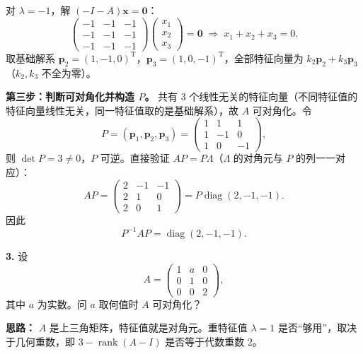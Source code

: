 对 \(\lambda=-1\)，解 \((-I-A)\mathbf{x}=\mathbf{0}\)：
\[
\begin{pmatrix}-1&-1&-1\\-1&-1&-1\\-1&-1&-1\end{pmatrix}
\begin{pmatrix}x_1\\x_2\\x_3\end{pmatrix}=\mathbf{0}
\;\Longrightarrow\;
x_1+x_2+x_3=0.
\]
取基础解系 \(\mathbf{p}_2=(1,-1,0)^{\mathrm{T}}\)，\(\mathbf{p}_3=(1,0,-1)^{\mathrm{T}}\)，全部特征向量为 \(k_2\mathbf{p}_2+k_3\mathbf{p}_3\)（\(k_2,k_3\) 不全为零）。

\textbf{第三步：判断可对角化并构造 \(P\)。}
共有 \(3\) 个线性无关的特征向量（不同特征值的特征向量线性无关，同一特征值取的是基础解系），故 \(A\) 可对角化。令
\[
P=(\mathbf{p}_1,\mathbf{p}_2,\mathbf{p}_3)=
\begin{pmatrix}
1&1&1\\
1&-1&0\\
1&0&-1
\end{pmatrix},
\]
则 \(\det P=3\neq0\)，\(P\) 可逆。直接验证 \(AP=P\Lambda\)（\(\Lambda\) 的对角元与 \(P\) 的列一一对应）：
\[
AP=
\begin{pmatrix}
2&-1&-1\\
2&1&0\\
2&0&1
\end{pmatrix}
=P\operatorname{diag}(2,-1,-1).
\]
因此
\[
P^{-1}AP=\operatorname{diag}(2,-1,-1).
\]

\else \answerarea[10] \fi%

\textbf{3.} 设
\[
A=\begin{pmatrix}1&a&0\\0&1&0\\0&0&2\end{pmatrix},
\]
其中 \(a\) 为实数。问 \(a\) 取何值时 \(A\) 可对角化？

\ifshowsolutions%
\textbf{思路：} \(A\) 是上三角矩阵，特征值就是对角元。重特征值 \(\lambda=1\) 是否“够用”，取决于几何重数，即 \(3-\operatorname{rank}(A-I)\) 是否等于代数重数 \(2\)。

